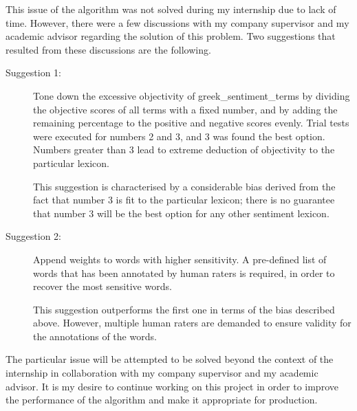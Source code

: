 This issue of the algorithm was not solved during my internship
due to lack of time.
However, there were a few discussions
with my company supervisor and my academic advisor
regarding the solution of this problem.
Two suggestions that resulted from these discussions are the following.

\begin{description}
 \item[Suggestion 1:] Tone down the excessive objectivity
 of greek\_sentiment\_terms
 by dividing the objective scores of all terms with a fixed number,
 and by adding the remaining percentage
 to the positive and negative scores evenly.
 Trial tests were executed for numbers 2 and 3,
 and 3 was found the best option.
 Numbers greater than 3 lead to extreme deduction of objectivity
 to the particular lexicon.
 
 This suggestion is characterised by a considerable bias
 derived from the fact that number 3 is fit to the particular lexicon;
 there is no guarantee that number 3 will be the best option
 for any other sentiment lexicon.
 
 \item[Suggestion 2:] Append weights to words with higher sensitivity.
 A pre-defined list of words that has been annotated
 by human raters is required,
 in order to recover the most sensitive words.
 
 This suggestion outperforms the first one
 in terms of the bias described above.
 However, multiple human raters are demanded
 to ensure validity for the annotations of the words.
\end{description}

The particular issue will be attempted to be solved
beyond the context of the internship
in collaboration with my company supervisor and my academic advisor.
It is my desire to continue working on this project
in order to improve the performance of the algorithm
and make it appropriate for production.
